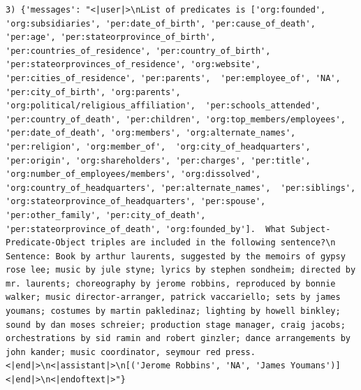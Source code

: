 \documentclass{article}
\begin{document}
\begin{lstlisting}
3) {'messages': "<|user|>\nList of predicates is ['org:founded', 'org:subsidiaries', 'per:date_of_birth', 'per:cause_of_death',  'per:age', 'per:stateorprovince_of_birth', 'per:countries_of_residence', 'per:country_of_birth',  'per:stateorprovinces_of_residence', 'org:website', 'per:cities_of_residence', 'per:parents',  'per:employee_of', 'NA', 'per:city_of_birth', 'org:parents', 'org:political/religious_affiliation',  'per:schools_attended', 'per:country_of_death', 'per:children', 'org:top_members/employees',  'per:date_of_death', 'org:members', 'org:alternate_names', 'per:religion', 'org:member_of',  'org:city_of_headquarters', 'per:origin', 'org:shareholders', 'per:charges', 'per:title',  'org:number_of_employees/members', 'org:dissolved', 'org:country_of_headquarters', 'per:alternate_names',  'per:siblings', 'org:stateorprovince_of_headquarters', 'per:spouse', 'per:other_family', 'per:city_of_death',  'per:stateorprovince_of_death', 'org:founded_by'].  What Subject-Predicate-Object triples are included in the following sentence?\n Sentence: Book by arthur laurents, suggested by the memoirs of gypsy rose lee; music by jule styne; lyrics by stephen sondheim; directed by mr. laurents; choreography by jerome robbins, reproduced by bonnie walker; music director-arranger, patrick vaccariello; sets by james youmans; costumes by martin pakledinaz; lighting by howell binkley; sound by dan moses schreier; production stage manager, craig jacobs; orchestrations by sid ramin and robert ginzler; dance arrangements by john kander; music coordinator, seymour red press.<|end|>\n<|assistant|>\n[('Jerome Robbins', 'NA', 'James Youmans')]<|end|>\n<|endoftext|>"}
\end{lstlisting}
\end{document}
